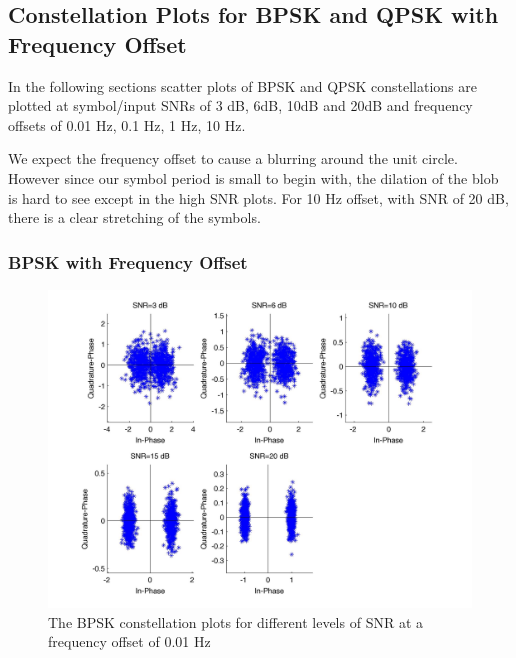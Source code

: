 \documentclass[]{article}
\begin{document}
\subsection{Constellation Plots for BPSK and QPSK with Frequency Offset}
In the following sections scatter plots of  BPSK and QPSK constellations are plotted at symbol/input SNRs of 3 dB, 6dB, 10dB and 20dB and frequency offsets of 0.01 Hz, 0.1 Hz, 1 Hz, 10 Hz.

We expect the frequency offset to cause a blurring around the unit circle.  However since our symbol period is small to begin with, the dilation of the blob is hard to see except in the high SNR plots.  For 10 Hz offset, with SNR of 20 dB, there is a clear stretching of the symbols.    

\subsubsection{BPSK with Frequency Offset}
\label{sec:bpsk_freqConst}
\begin{figure}[H]
\centering
\hspace*{-2cm}\includegraphics[width=1.3\textwidth]{bpConstfo1.jpg}
\caption{The BPSK constellation plots for different levels of SNR at a frequency offset of 0.01 Hz}
\end{figure}
\end{document}
